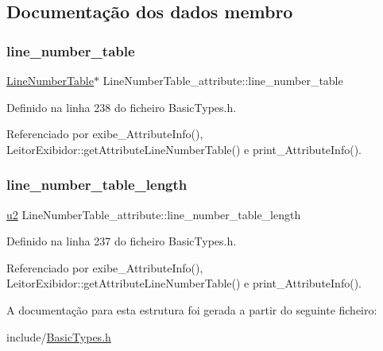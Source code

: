 \subsection{Documentação dos dados membro}
\mbox{\label{structLineNumberTable__attribute_a8ec83f7d8f19a6a480733a9c87a6d7f8}} 
\subsubsection{\texorpdfstring{line\+\_\+number\+\_\+table}{line\_number\_table}}
{\footnotesize\ttfamily \hyperlink{structLineNumberTable}{Line\+Number\+Table}$\ast$ Line\+Number\+Table\+\_\+attribute\+::line\+\_\+number\+\_\+table}



Definido na linha 238 do ficheiro Basic\+Types.\+h.



Referenciado por exibe\+\_\+\+Attribute\+Info(), Leitor\+Exibidor\+::get\+Attribute\+Line\+Number\+Table() e print\+\_\+\+Attribute\+Info().

\mbox{\label{structLineNumberTable__attribute_a758c7ed4a08f1398c0ab0966ea59d7d4}} 
\subsubsection{\texorpdfstring{line\+\_\+number\+\_\+table\+\_\+length}{line\_number\_table\_length}}
{\footnotesize\ttfamily \hyperlink{BasicTypes_8h_a732cde1300aafb73b0ea6c2558a7a54f}{u2} Line\+Number\+Table\+\_\+attribute\+::line\+\_\+number\+\_\+table\+\_\+length}



Definido na linha 237 do ficheiro Basic\+Types.\+h.



Referenciado por exibe\+\_\+\+Attribute\+Info(), Leitor\+Exibidor\+::get\+Attribute\+Line\+Number\+Table() e print\+\_\+\+Attribute\+Info().



A documentação para esta estrutura foi gerada a partir do seguinte ficheiro\+:\begin{DoxyCompactItemize}
\item 
include/\hyperlink{BasicTypes_8h}{Basic\+Types.\+h}\end{DoxyCompactItemize}
